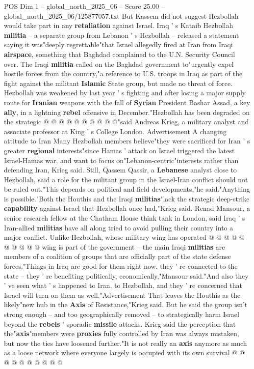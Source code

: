 \begin{textsample}{POS Dim 1 – global\_north\_2025\_06 – Score 25.00 – global\_north\_2025\_06/125877057.txt}
But Kassem did not suggest Hezbollah would take part in any \textbf{retaliation} against Israel.
Iraq ' s Kataib Hezbollah \textbf{militia} -- a separate group from Lebanon ' s Hezbollah -- released a statement saying it was"deeply regrettable"that Israel allegedly fired at Iran from Iraqi \textbf{airspace}, something that Baghdad complained to the U.N.
Security Council over.
The Iraqi \textbf{militia} called on the Baghdad government to"urgently expel hostile forces from the country,"a reference to U.S. troops in Iraq as part of the fight against the militant \textbf{Islamic} State group, but made no threat of force.
Hezbollah was weakened by last year ' s fighting and after losing a major supply route for \textbf{Iranian} weapons with the fall of \textbf{Syrian} President Bashar Assad, a key \textbf{ally}, in a lightning \textbf{rebel} offensive in December."Hezbollah has been degraded on the strategic @ @ @ @ @ @ @ @ @ @"said Andreas Krieg, a military analyst and associate professor at King ' s College London.
Advertisement A changing attitude to Iran Many Hezbollah members believe"they were sacrificed for Iran ' s greater \textbf{regional} interests"since Hamas ' attack on Israel triggered the latest Israel-Hamas war, and want to focus on"Lebanon-centric"interests rather than defending Iran, Krieg said.
Still, Qassem Qassir, a \textbf{Lebanese} analyst close to Hezbollah, said a role for the militant group in the Israel-Iran conflict should not be ruled out."This depends on political and field developments,"he said."Anything is possible."Both the Houthis and the Iraqi \textbf{militias}"lack the strategic deep-strike \textbf{capability} against Israel that Hezbollah once had,"Krieg said.
Renad Mansour, a senior research fellow at the Chatham House think tank in London, said Iraq ' s Iran-allied \textbf{militias} have all along tried to avoid pulling their country into a major conflict.
Unlike Hezbollah, whose military wing has operated @ @ @ @ @ @ @ @ @ @ wing is part of the government -- the main Iraqi \textbf{militias} are members of a coalition of groups that are officially part of the state defense forces."Things in Iraq are good for them right now, they ' re connected to the state -- they ' re benefiting politically, economically,"Mansour said."And also they ' ve seen what ' s happened to Iran, to Hezbollah, and they ' re concerned that Israel will turn on them as well."Advertisement That leaves the Houthis as the likely"new hub in the \textbf{Axis} of Resistance,"Krieg said.
But he said the group isn't strong enough -- and too geographically removed -- to strategically harm Israel beyond the \textbf{rebels} ' sporadic \textbf{missile} attacks.
Krieg said the perception that the"\textbf{axis}"members were \textbf{proxies} fully controlled by Iran was always mistaken, but now the ties have loosened further."It is not really an \textbf{axis} anymore as much as a loose network where everyone largely is occupied with its own survival @ @ @ @ @ @ @ @ @ @


\end{textsample}
